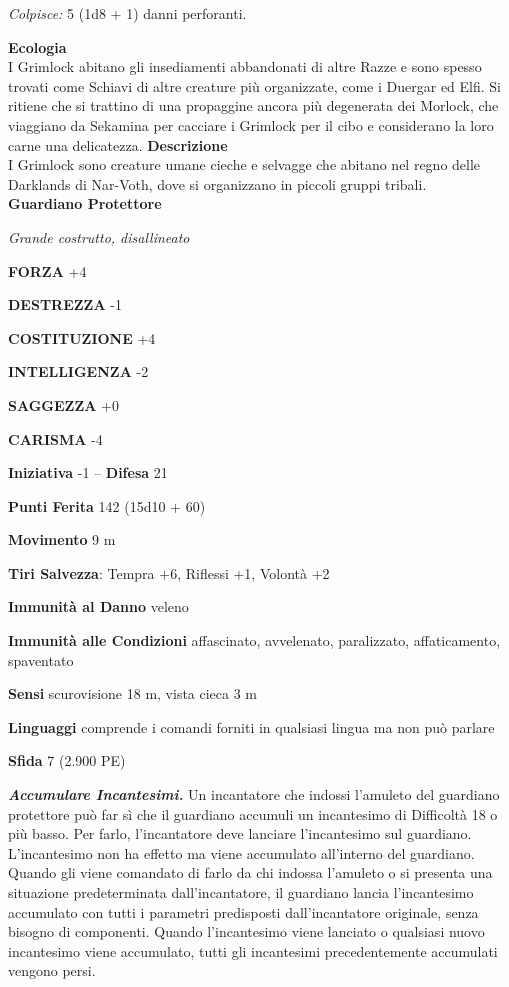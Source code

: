 \begin{multicols}{2}
\emph{Colpisce:} 5 (1d8 + 1) danni perforanti.

\textbf{Ecologia}\\
I Grimlock abitano gli insediamenti abbandonati di altre Razze e sono spesso trovati come Schiavi di altre creature più organizzate, come i Duergar ed Elfi. Si ritiene che si trattino di una propaggine ancora più degenerata dei Morlock, che viaggiano da Sekamina per cacciare i Grimlock per il cibo e considerano la loro carne una delicatezza.
\textbf{Descrizione}\\
I Grimlock sono creature umane cieche e selvagge che abitano nel regno delle Darklands di Nar-Voth, dove si organizzano in piccoli gruppi tribali.\\


\medskip{}\textbf{Guardiano Protettore}

\emph{Grande costrutto, disallineato}

\textbf{FORZA} +4

\textbf{DESTREZZA} -1

\textbf{COSTITUZIONE} +4

\textbf{INTELLIGENZA} -2

\textbf{SAGGEZZA} +0

\textbf{CARISMA} -4

\textbf{Iniziativa} -1 -- \textbf{Difesa} 21

\textbf{Punti Ferita} 142 (15d10 + 60)

\textbf{Movimento} 9 m

\textbf{Tiri Salvezza}: Tempra +6, Riflessi +1, Volontà +2

\textbf{Immunità al Danno} veleno

\textbf{Immunità alle Condizioni} affascinato, avvelenato, paralizzato, affaticamento, spaventato

\textbf{Sensi} scurovisione 18 m, vista cieca 3 m

\textbf{Linguaggi} comprende i comandi forniti in qualsiasi lingua ma non può parlare

\textbf{Sfida} 7 (2.900 PE)

\emph{\textbf{Accumulare Incantesimi.}} Un incantatore che indossi l'amuleto del guardiano protettore può far sì che il guardiano accumuli un incantesimo di Difficoltà 18 o più basso. Per farlo, l'incantatore deve lanciare l'incantesimo sul guardiano. L'incantesimo non ha effetto ma viene accumulato all'interno del guardiano. Quando gli viene comandato di farlo da chi indossa l'amuleto o si presenta una situazione predeterminata dall'incantatore, il guardiano lancia l'incantesimo accumulato con tutti i parametri predisposti dall'incantatore originale, senza bisogno di componenti. Quando l'incantesimo viene lanciato o qualsiasi nuovo incantesimo viene accumulato, tutti gli incantesimi precedentemente accumulati vengono persi.


\end{multicols}
